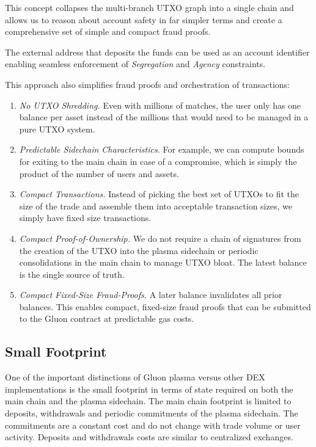 \documentclass[12pt,a4paper]{article}
\begin{document}
This concept collapses the multi-branch UTXO graph into a single chain and allows us to reason about account safety in far simpler terms and create a comprehensive set of simple and compact fraud proofs.

The external address that deposits the funds can be used as an account identifier enabling seamless enforcement of \emph{Segregation} and \emph{Agency} constraints.

This approach also simplifies fraud proofs and orchestration of transactions:

\begin{enumerate}
    \item \emph{No UTXO Shredding.} Even with millions of matches, the user only has one balance per asset instead of the millions that would need to be managed in a pure UTXO system.
    \item \emph{Predictable  Sidechain Characteristics.} For example, we can compute bounds for exiting to the main chain in case of a compromise, which is simply the product of the number of users and assets.
    \item \emph{Compact Transactions.} Instead of picking the best set of UTXOs to fit the size of the trade and assemble them into acceptable transaction sizes, we simply have fixed size transactions.
    \item \emph{Compact Proof-of-Ownership.} We do not require a chain of signatures from the creation of the UTXO into the plasma sidechain or periodic consolidations in the main chain to manage UTXO bloat. The latest balance is the single source of truth.
    \item \emph{Compact Fixed-Size Fraud-Proofs.} A later balance invalidates all prior balances. This enables compact, fixed-size fraud proofs that can be submitted to the Gluon contract at predictable gas costs.
\end{enumerate}

\subsection{Small Footprint}
One of the important distinctions of Gluon plasma versus other DEX implementations is the small footprint in terms of state required on both the main chain and the plasma sidechain. The main chain footprint is limited to deposits, withdrawals and periodic commitments of the plasma sidechain. The commitments are a constant cost and do not change with trade volume or user activity. Deposits and withdrawals costs are similar to centralized exchanges.
\end{document}
